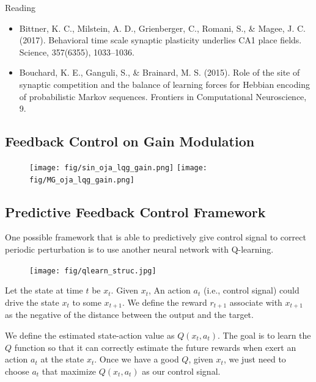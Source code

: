 \documentclass[12pt, a4paper]{article}
\begin{document}
\noindent
Reading

\begin{itemize}
    \item Bittner, K. C., Milstein, A. D., Grienberger, C., Romani, S., \& Magee, J. C. (2017). Behavioral time scale synaptic plasticity underlies CA1 place fields. Science, 357(6355), 1033–1036.
    \item Bouchard, K. E., Ganguli, S., \& Brainard, M. S. (2015). Role of the site of synaptic competition and the balance of learning forces for Hebbian encoding of probabilistic Markov sequences. Frontiers in Computational Neuroscience, 9.
\end{itemize}

\newpage

\subsection*{Feedback Control on Gain Modulation}

\begin{figure}[H]
    \centering
    \texttt{[image: fig/sin\_oja\_lqg\_gain.png]}
    \texttt{[image: fig/MG\_oja\_lqg\_gain.png]}
    \label{fig:1}
\end{figure}

\newpage

\subsection*{Predictive Feedback Control Framework}

One possible framework that is able to predictively give control signal to correct periodic perturbation is to use another neural network with Q-learning.

\begin{figure}[H]
    \centering
    \texttt{[image: fig/qlearn\_struc.jpg]}
    \label{fig:1}
\end{figure}

Let the state at time $t$ be $x_t$. Given $x_t$, An action $a_t$ (i.e., control signal) could drive the state $x_t$ to some $x_{t+1}$. We define the reward $r_{t+1}$ associate with $x_{t+1}$ as the negative of the distance between the output and the target.

We define the estimated state-action value as $Q(x_t, a_t)$. The goal is to learn the $Q$ function so that it can correctly estimate the future rewards when exert an action $a_t$ at the state $x_t$. Once we have a good $Q$, given $x_t$, we just need to choose $a_t$ that maximize $Q(x_t, a_t)$ as our control signal.
\end{document}

